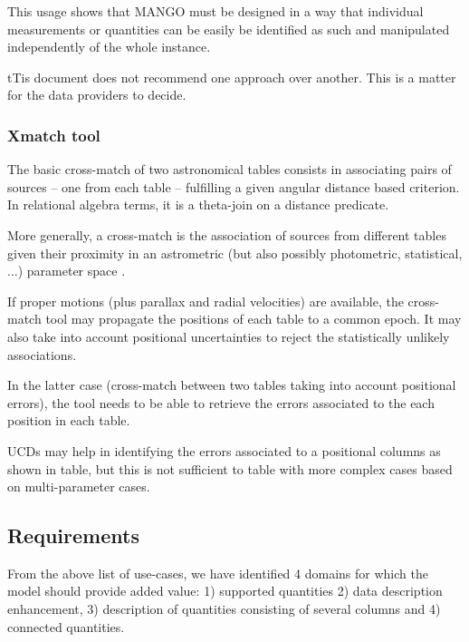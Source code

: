 \documentclass[11pt,a4paper]{ivoa}
\begin{document}
This usage shows that MANGO must be designed in a way that individual measurements or quantities
can be easily be identified as such and manipulated independently of the whole instance.


tTis document does not recommend one approach over another.
This is a matter for the data providers to decide.

\subsubsection{Xmatch tool }
The basic cross-match of two astronomical tables consists in associating pairs of sources -- one 
from each table -- fulfilling a given angular distance based criterion.
In relational algebra terms, it is a theta-join on a distance predicate.

More generally, a cross-match is the association of sources from different tables given their 
proximity in an astrometric (but also possibly photometric, statistical, ...) parameter
space \citep{2017A&A...597A..89P} .

If proper motions (plus parallax and radial velocities) are available, the cross-match tool 
may propagate the positions of each table to a common epoch.
It may also take into account positional uncertainties to reject the statistically unlikely associations.

In the latter case (cross-match between two tables taking into account positional errors),
the tool needs to be able to retrieve the errors associated to the each position in each table.

UCDs may help in identifying the errors associated to a positional columns as shown in 
table, but this is not sufficient to table with more complex cases based on multi-parameter cases.


\subsection{Requirements}

From the above list of use-cases, we have identified 4 domains for which
the model should provide added value: 1) supported quantities 2) data description enhancement,
3) description of quantities consisting of several columns and 4) connected quantities.
\end{document}
